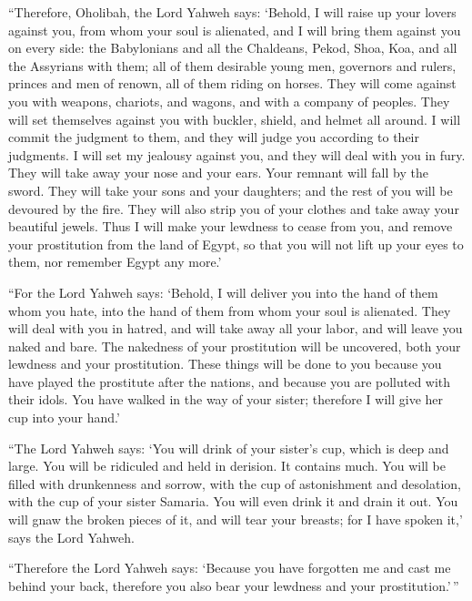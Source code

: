 ``Therefore, Oholibah, the Lord Yahweh says: `Behold, I
will raise up your lovers against you, from whom your soul is alienated,
and I will bring them against you on every side:  the
Babylonians and all the Chaldeans, Pekod, Shoa, Koa, and all the
Assyrians with them; all of them desirable young men, governors and
rulers, princes and men of renown, all of them riding on horses.
 They will come against you with weapons, chariots, and
wagons, and with a company of peoples. They will set themselves against
you with buckler, shield, and helmet all around. I will commit the
judgment to them, and they will judge you according to their judgments.
 I will set my jealousy against you, and they will deal
with you in fury. They will take away your nose and your ears. Your
remnant will fall by the sword. They will take your sons and your
daughters; and the rest of you will be devoured by the fire.
 They will also strip you of your clothes and take away
your beautiful jewels.  Thus I will make your lewdness to
cease from you, and remove your prostitution from the land of Egypt, so
that you will not lift up your eyes to them, nor remember Egypt any
more.'

 ``For the Lord Yahweh says: `Behold, I will deliver you
into the hand of them whom you hate, into the hand of them from whom
your soul is alienated.  They will deal with you in hatred,
and will take away all your labor, and will leave you naked and bare.
The nakedness of your prostitution will be uncovered, both your lewdness
and your prostitution.  These things will be done to you
because you have played the prostitute after the nations, and because
you are polluted with their idols.  You have walked in the
way of your sister; therefore I will give her cup into your hand.'

 ``The Lord Yahweh says: `You will drink of your sister's
cup, which is deep and large. You will be ridiculed and held in
derision. It contains much.  You will be filled with
drunkenness and sorrow, with the cup of astonishment and desolation,
with the cup of your sister Samaria.  You will even drink
it and drain it out. You will gnaw the broken pieces of it, and will
tear your breasts; for I have spoken it,' says the Lord Yahweh.

 ``Therefore the Lord Yahweh says: `Because you have
forgotten me and cast me behind your back, therefore you also bear your
lewdness and your prostitution.'\,''

